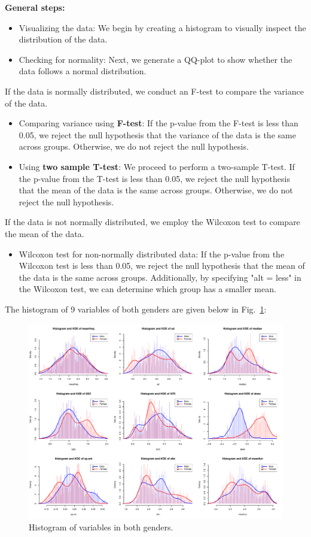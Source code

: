 \documentclass{article}
\begin{document}
	\textbf{General steps:}
	\begin{itemize}
		\item Visualizing the data: We begin by creating a histogram to visually inspect the distribution of the data.
		\item Checking for normality: Next, we generate a QQ-plot to show whether the data follows a normal distribution.
	\end{itemize}
	If the data is normally distributed, we conduct an F-test to compare the variance of the data.
	\begin{itemize}
		\item Comparing variance using \textbf{F-test}: If the p-value from the F-test is less than 0.05, we reject the null hypothesis that the variance of the data is the same across groups. Otherwise, we do not reject the null hypothesis.
		\item Using \textbf{two sample T-test}: We proceed to perform a two-sample T-test. If the p-value from the T-test is less than 0.05, we reject the null hypothesis that the mean of the data is the same across groups. Otherwise, we do not reject the null hypothesis.
	\end{itemize}
	If the data is not normally distributed, we employ the Wilcoxon test to compare the mean of the data.
	\begin{itemize}
		\item Wilcoxon test for non-normally distributed data: If the p-value from the Wilcoxon test is less than 0.05, we reject the null hypothesis that the mean of the data is the same across groups. Additionally, by specifying "alt = less" in the Wilcoxon test, we can determine which group has a smaller mean.
	\end{itemize}
	The histogram of 9 variables of both genders are given below in Fig.~\ref{hist_bothgender}:
	\begin{figure}
		\centering
		\includegraphics[width=\textwidth]{graphs/gender/visualizations.pdf}
		\caption{Histogram of variables in both genders.}
		\label{hist_bothgender}
	\end{figure}
	
\end{document}
